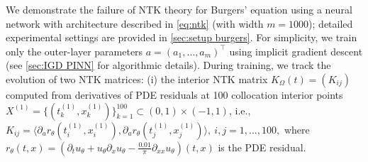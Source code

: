 \documentclass{article}
\begin{document}
We demonstrate the failure of NTK theory for Burgers' equation using a neural network with architecture described in \cref{eq:ntk} (with width \( m=1000 \)); detailed experimental settings are provided in \cref{sec:setup burgers}.  
For simplicity, we train only the outer-layer parameters $a=(a_1, \ldots, a_m)^\top$ using implicit gradient descent (see \cref{sec:IGD PINN} for algorithmic details). 
During training, we track the evolution of two NTK matrices:
\iffalse
    (i) the interior NTK matrix \( K_{\Omega}(t)=(K_{ij})\) computed from derivatives of PDE residuals at 100 collocation interior points $X^{(1)}=\{(t_k^{(1)},x_k^{(1)})\}_{k=1}^{100}\subset(0,1)\times(-1,1)$, i.e.,
$
    K_{ij}=\langle \partial_a r_{\theta}(t_i^{(1)},x_i^{(1)}), \partial_a r_{\theta}(t_j^{(1)},x_j^{(1)}) \rangle ,\ i,j=1,\ldots,100,
$
    where \( r_{\theta}(t,x) = \left(\partial_t u_{\theta}+u_{\theta}\partial_{x}u_{\theta}-\frac{0.01}{\pi}\partial_{xx}u_{\theta}\right)(t,x)\) is the PDE residual.
    
\end{document}
